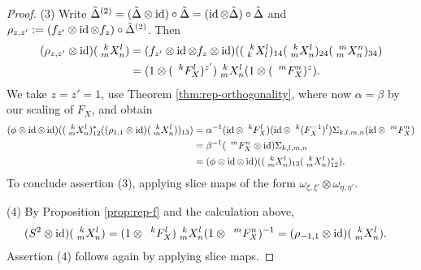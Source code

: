 \begin{proof}
   
    (3)  Write $\tilde \Delta^{(2)} = (\tilde
    \Delta \otimes \id)\circ \tilde \Delta = (\id \otimes \tilde
    \Delta) \circ \tilde \Delta$ and $\rho_{z,z'}:=(f_{z'} \otimes \id
    \otimes f_{z})\circ \tilde \Delta^{(2)}$. Then
    \begin{align*}
      (\rho_{z,z'} \otimes \id)(\Gr{X}{k}{l}{m}{n}) &= (f_{z'} \otimes
      \id \otimes f_{z} \otimes
      \id)((\Gr{X}{k}{l}{k}{l})_{14}(\Gr{X}{k}{l}{m}{n})_{24}(\Gr{X}{m}{n}{m}{n})_{34})
      \\
      &= (1 \otimes (\Gru{F_{X}}{k}{l})^{z'}) \Gr{X}{k}{l}{m}{n} (1
      \otimes (\Gru{F_{X}}{m}{n})^{z}).
    \end{align*}
    We take $z=z'=1$, use Theorem \ref{thm:rep-orthogonality}, where
    now $\alpha= \beta$ by our scaling of $F_{X}$, and obtain
    \begin{align*}
      (\phi \otimes \id \otimes
      \id)((\Gr{X}{k}{l}{m}{n})_{12}^{*}((\rho_{1,1} \otimes
      \id)(\Gr{X}{k}{l}{m}{n}))_{13}) &=\alpha^{-1}(\id \otimes
      \Gru{F_{X}}{k}{l}) (\id \otimes \Gru{(F_{X}^{-1})}{k}{l})
      \Sigma_{k,l,m,n} (\id \otimes
      \Gru{F_{X}}{m}{n}) \\
      &=\beta^{-1}(\Gru{F_{X}}{m}{n} \otimes \id) \Sigma_{k,l,m,n} \\
      &= (\phi \otimes \id \otimes
      \id)((\Gr{X}{k}{l}{m}{n})_{13}(\Gr{X}{k}{l}{m}{n})_{12}^{*}).
    \end{align*}
    To conclude assertion (3), applying slice maps of the form
    $\omega_{\xi,\xi'} \otimes \omega_{\eta,\eta'}$.

    (4) By Proposition \ref{prop:rep-f} and the calculation above,
    \begin{align*}
      (S^{2} \otimes \id)(\Gr{X}{k}{l}{m}{n}) &= (1
      \otimes\Gru{F_{X}}{k}{l})
      \Gr{X}{k}{l}{m}{n}(1 \otimes \Gru{F_{X}}{m}{n})^{-1} 
      =(\rho_{-1,1}  \otimes \id)(\Gr{X}{k}{l}{m}{n}).
    \end{align*}
     Assertion (4) follows again by applying slice maps.
    

\end{proof}
